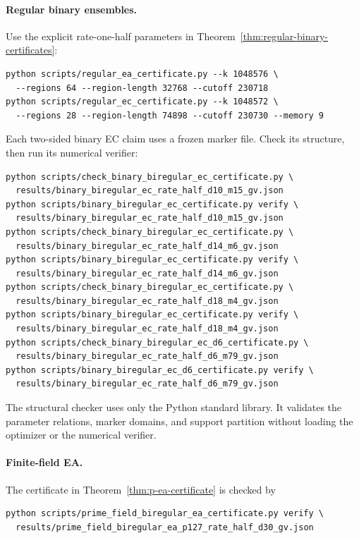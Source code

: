 \paragraph{Regular binary ensembles.}
Use the explicit rate-one-half parameters in
Theorem~\ref{thm:regular-binary-certificates}:
\begin{verbatim}
python scripts/regular_ea_certificate.py --k 1048576 \
  --regions 64 --region-length 32768 --cutoff 230718
python scripts/regular_ec_certificate.py --k 1048572 \
  --regions 28 --region-length 74898 --cutoff 230730 --memory 9
\end{verbatim}
Each two-sided binary EC claim uses a frozen marker file.  Check its structure,
then run its numerical verifier:
\begin{verbatim}
python scripts/check_binary_biregular_ec_certificate.py \
  results/binary_biregular_ec_rate_half_d10_m15_gv.json
python scripts/binary_biregular_ec_certificate.py verify \
  results/binary_biregular_ec_rate_half_d10_m15_gv.json
python scripts/check_binary_biregular_ec_certificate.py \
  results/binary_biregular_ec_rate_half_d14_m6_gv.json
python scripts/binary_biregular_ec_certificate.py verify \
  results/binary_biregular_ec_rate_half_d14_m6_gv.json
python scripts/check_binary_biregular_ec_certificate.py \
  results/binary_biregular_ec_rate_half_d18_m4_gv.json
python scripts/binary_biregular_ec_certificate.py verify \
  results/binary_biregular_ec_rate_half_d18_m4_gv.json
python scripts/check_binary_biregular_ec_d6_certificate.py \
  results/binary_biregular_ec_rate_half_d6_m79_gv.json
python scripts/binary_biregular_ec_d6_certificate.py verify \
  results/binary_biregular_ec_rate_half_d6_m79_gv.json
\end{verbatim}
The structural checker uses only the Python standard library.  It validates
the parameter relations, marker domains, and support partition without
loading the optimizer or the numerical verifier.

\paragraph{Finite-field EA.}
The certificate in Theorem~\ref{thm:p-ea-certificate} is checked by
\begin{verbatim}
python scripts/prime_field_biregular_ea_certificate.py verify \
  results/prime_field_biregular_ea_p127_rate_half_d30_gv.json
\end{verbatim}

